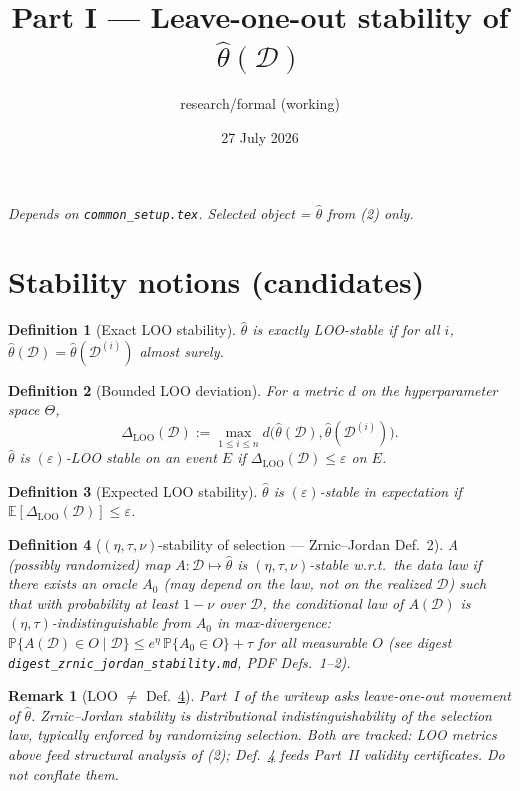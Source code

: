 \documentclass[11pt]{article}
\title{Part I --- Leave-one-out stability of $\hat\theta(\mathcal{D})$}
\author{research/formal (working)}
\date{27 July 2026}
\newtheorem{definition}{Definition}
\newtheorem{remark}{Remark}
\begin{document}
\maketitle

\noindent\textit{Depends on \texttt{common\_setup.tex}. Selected object = $\hat\theta$ from (2) only.}

\section{Stability notions (candidates)}

\begin{definition}[Exact LOO stability]
$\hat\theta$ is \emph{exactly LOO-stable} if for all $i$,
$\hat\theta(\mathcal{D})=\hat\theta(\mathcal{D}^{(i)})$ almost surely.
\end{definition}

\begin{definition}[Bounded LOO deviation]
For a metric $d$ on the hyperparameter space $\Theta$,
\[
\Delta_{\mathrm{LOO}}(\mathcal{D})
:=
\max_{1\le i\le n}
d\bigl(\hat\theta(\mathcal{D}),\hat\theta(\mathcal{D}^{(i)})\bigr).
\]
$\hat\theta$ is $(\varepsilon)$-LOO stable on an event $E$ if
$\Delta_{\mathrm{LOO}}(\mathcal{D})\le\varepsilon$ on $E$.
\end{definition}

\begin{definition}[Expected LOO stability]
$\hat\theta$ is $(\varepsilon)$-stable in expectation if
$\mathbb{E}[\Delta_{\mathrm{LOO}}(\mathcal{D})]\le\varepsilon$.
\end{definition}

\begin{definition}[$(\eta,\tau,\nu)$-stability of selection --- Zrnic--Jordan Def.~2]
\label{def:zj-stable}
A (possibly randomized) map $A:\mathcal{D}\mapsto\hat\theta$ is
$(\eta,\tau,\nu)$-stable w.r.t.\ the data law if there exists an oracle
$A_0$ (may depend on the law, \emph{not} on the realized $\mathcal{D}$) such that
with probability at least $1-\nu$ over $\mathcal{D}$,
the conditional law of $A(\mathcal{D})$ is $(\eta,\tau)$-indistinguishable from $A_0$
in max-divergence:
$\mathbb{P}\{A(\mathcal{D})\in O\mid\mathcal{D}\}
\le e^\eta\,\mathbb{P}\{A_0\in O\}+\tau$ for all measurable $O$
(see digest \texttt{digest\_zrnic\_jordan\_stability.md}, PDF Defs.~1--2).
\end{definition}

\begin{remark}[LOO $\neq$ Def.~\ref{def:zj-stable}]
Part~I of the writeup asks leave-one-out \emph{movement} of $\hat\theta$.
Zrnic--Jordan stability is \emph{distributional indistinguishability of the selection law},
typically enforced by randomizing selection.
Both are tracked: LOO metrics above feed structural analysis of (2);
Def.~\ref{def:zj-stable} feeds Part~II validity certificates.
Do not conflate them.
\end{remark}
\end{document}
